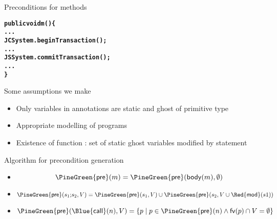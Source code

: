 \documentclass[final,nocolorBG,a4,marieke,nototal,pdf, accumulate,slideColor]{prosper}
\begin{document}
\begin{slide}{Preconditions for methods}
\begin{alltt}
\textbf{public void m() \{
   ...
   JCSystem.beginTransaction();
   ...
   JSSystem.commitTransaction();
   ...
   \}}
\end{alltt}
\end{slide}

\begin{slide}{Some assumptions we make}
\begin{itemize}
  \item Only variables in annotations are static and ghost of primitive type
  \item Appropriate modelling of programs
  \item Existence of function {\large\textsf{}}: set of static ghost
variables modified by statement 
\end{itemize}
\end{slide}

\begin{slide}{Algorithm for precondition generation}
\begin{itemize}
   \item {}
\[\mathsf{\PineGreen{pre}}(m)  =  \mathsf{\PineGreen{pre}}(\mathsf{body}(m), \emptyset)\]
   \item {}
\[\mathsf{\PineGreen{pre}}(s_1 \mathtt{;} s_2, V)  =  \mathsf{\PineGreen{pre}}(s_1, V) \cup 
                                          \mathsf{\PineGreen{pre}}(s_2, V \cup
\mathsf{\Red{mod}}(s1))\]
   \item {}
\[\mathsf{\PineGreen{pre}}(\mathsf{\Blue{call}}(n),V)  =  
                \{ p \mid p \in \mathsf{\PineGreen{pre}}(n) \wedge 
                          \mathsf{fv}(p) \cap V = \emptyset\}\]
\end{itemize}
\end{slide}
\end{document}
